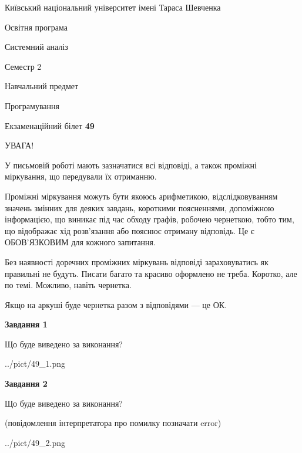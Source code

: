 \documentclass[12pt, ukrainian]{article}
\begin{document}
{{\begin {small}\par
{ \center  Київський національний університет імені Тараса Шевченка \par}
{\parbox {5 cm}{Освітня програма \hfill}{\parbox {7 cm}{Системний аналіз \hfill}}\parbox {6 cm}{\hfill Семестр 2}}\par
{\parbox {5 cm} {Навчальний предмет \hfill}\parbox {7 cm}{Програмування \hfill}\parbox {6cm}{\hfill}\par}\vspace{-7pt} \end{small}}{\center Екзаменаційний білет \No \textbf
{ 49 }\par}}
{
\begin {large}
УВАГА!

У письмовій роботі мають зазначатися всі відповіді, а також проміжні міркування, що передували їх отриманню.

Проміжні міркування можуть бути якоюсь арифметикою, відслідковуванням зна\-чень змінних для деяких завдань,
короткими поясненнями, допоміжною інформацією, що виникає під час обходу графів, робочею чернеткою,
тобто тим, що відображає хід розв’язання або пояснює отриману відповідь.
Це є ОБОВ’ЯЗКОВИМ для кожного запитання.

Без наявності доречних проміжних міркувань відповіді зараховуватись як правиль\-ні не будуть.
Писати багато та красиво оформлено не треба. Коротко, але по темі. Можли\-во, навіть чернетка.

Якщо на аркуші буде чернетка разом з відповідями --- це ОК.

\newpage

{\begin {center}\textbf{Завдання 1}\end {center}}\par
Що буде виведено за виконання?\par
\begin{center}
	{../pict/49_1.png}
\end{center}
\newpage

{\begin {center}\textbf{Завдання 2}\end {center}}\par
Що буде виведено за виконання?\par
 (повідомлення інтерпретатора про помилку позначати error)\par
\begin{center}
	{../pict/49_2.png}
\end{center}
\newpage


\end{large}}
\end{document}
